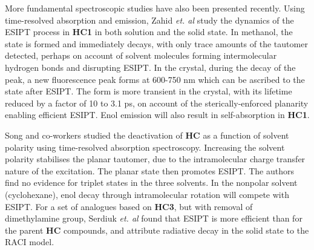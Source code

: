More fundamental spectroscopic studies have also been presented recently. Using time-resolved absorption and emission, Zahid \textit{et. al} study the dynamics of the ESIPT process in \textbf{HC1} in both solution and the solid state.\cite{Zahid2017} In methanol, the \Estar{} state is formed and immediately decays, with only trace amounts of the \Kstar{} tautomer detected, perhaps on account of solvent molecules forming intermolecular hydrogen bonds and disrupting ESIPT. In the crystal, during the decay of the \Estar{} peak, a new fluorescence peak forms at 600-750 nm which can be ascribed to the \Kstar{} state after ESIPT. The \Estar{} form is more transient in the crystal, with its lifetime reduced by a factor of 10 to 3.1 ps, on account of the sterically-enforced planarity enabling efficient ESIPT. Enol emission will also result in self-absorption in \textbf{HC1}.

Song and co-workers studied the deactivation of \textbf{HC} as a function of solvent polarity using time-resolved absorption spectroscopy.\cite{Song2018} Increasing the solvent polarity stabilises the planar \Estar{} tautomer, due to the intramolecular charge transfer nature of the excitation. The planar \Estar{} state then promotes ESIPT. The authors find no evidence for triplet states in the three solvents. In the nonpolar solvent (cyclohexane), enol decay through intramolecular rotation will compete with ESIPT. For a set of analogues based on \textbf{HC3}, but with removal of dimethylamine group, Serdiuk \textit{et. al} found that ESIPT is more efficient than for the parent \textbf{HC} compounds, and attribute radiative decay in the solid state to the RACI model.\cite{Serdiuk2018}






